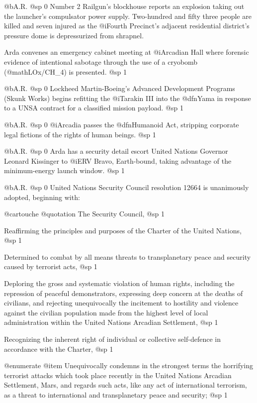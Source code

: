 @b{A.R.}
@sp 0
Number 2 Railgun's blockhouse reports an explosion taking out the launcher's compulsator power supply. Two-hundred and fifty three people are killed and seven injured as the @i{Fourth Precinct's} adjacent residential district's pressure dome is depressurized from shrapnel.

Arda convenes an emergency cabinet meeting at @i{Arcadian Hall} where forensic evidence of intentional sabotage through the use of a cryobomb (@math{LOx/CH_4}) is presented.
@sp 1

@b{A.R.}
@sp 0
Lockheed Martin-Boeing's Advanced Development Programs (Skunk Works) begins refitting the @i{Tarakin III} into the @dfn{Yama} in response to a UNSA contract for a classified mission payload.
@sp 1

@b{A.R.}
@sp 0
@i{Arcadia} passes the @dfn{Humanoid Act}, stripping corporate legal fictions of the rights of human beings.
@sp 1

@b{A.R.}
@sp 0
Arda has a security detail escort United Nations Governor Leonard Kissinger to @i{ERV Bravo}, Earth-bound, taking advantage of the minimum-energy launch window.
@sp 1

@b{A.R.}
@sp 0
United Nations Security Council resolution 12664 is unanimously adopted, beginning with:

@cartouche
@quotation
The Security Council,
@sp 1

Reaffirming the principles and purposes of the Charter of the United Nations,
@sp 1

Determined to combat by all means threats to transplanetary peace and security caused by terrorist acts,
@sp 1

Deploring the gross and systematic violation of human rights, including the repression of peaceful demonstrators, expressing deep concern at the deaths of civilians, and rejecting unequivocally the incitement to hostility and violence against the civilian population made from the highest level of local administration within the United Nations Arcadian Settlement,
@sp 1

Recognizing the inherent right of individual or collective self-defence in accordance with the Charter,
@sp 1

@enumerate
@item
Unequivocally condemns in the strongest terms the horrifying terrorist attacks which took place recently in the United Nations Arcadian Settlement, Mars, and regards such acts, like any act of international terrorism, as a threat to international and transplanetary peace and security;
@sp 1

